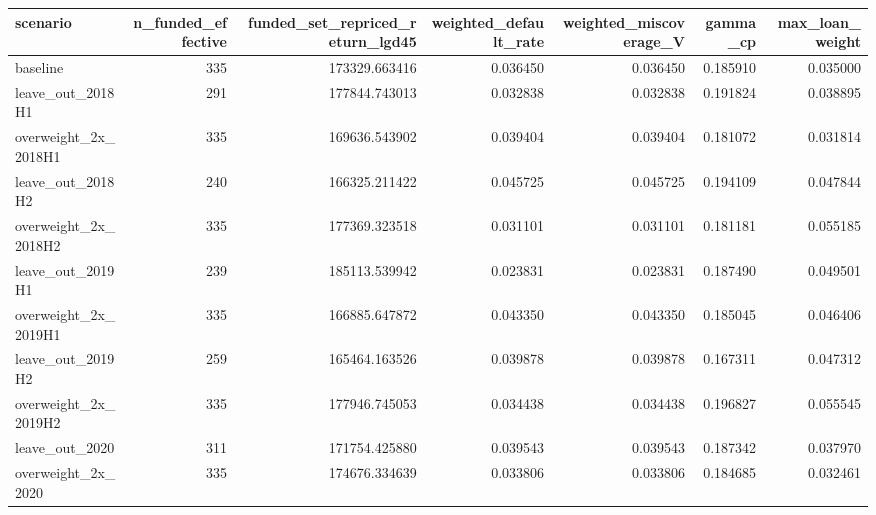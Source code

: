 \begin{tabular}{lrrrrrr}
\toprule
scenario & n\_funded\_effective & funded\_set\_repriced\_return\_lgd45 & weighted\_default\_rate & weighted\_miscoverage\_V & gamma\_cp & max\_loan\_weight \\
\midrule
baseline & 335 & 173329.663416 & 0.036450 & 0.036450 & 0.185910 & 0.035000 \\
leave\_out\_2018H1 & 291 & 177844.743013 & 0.032838 & 0.032838 & 0.191824 & 0.038895 \\
overweight\_2x\_2018H1 & 335 & 169636.543902 & 0.039404 & 0.039404 & 0.181072 & 0.031814 \\
leave\_out\_2018H2 & 240 & 166325.211422 & 0.045725 & 0.045725 & 0.194109 & 0.047844 \\
overweight\_2x\_2018H2 & 335 & 177369.323518 & 0.031101 & 0.031101 & 0.181181 & 0.055185 \\
leave\_out\_2019H1 & 239 & 185113.539942 & 0.023831 & 0.023831 & 0.187490 & 0.049501 \\
overweight\_2x\_2019H1 & 335 & 166885.647872 & 0.043350 & 0.043350 & 0.185045 & 0.046406 \\
leave\_out\_2019H2 & 259 & 165464.163526 & 0.039878 & 0.039878 & 0.167311 & 0.047312 \\
overweight\_2x\_2019H2 & 335 & 177946.745053 & 0.034438 & 0.034438 & 0.196827 & 0.055545 \\
leave\_out\_2020 & 311 & 171754.425880 & 0.039543 & 0.039543 & 0.187342 & 0.037970 \\
overweight\_2x\_2020 & 335 & 174676.334639 & 0.033806 & 0.033806 & 0.184685 & 0.032461 \\
\bottomrule
\end{tabular}
